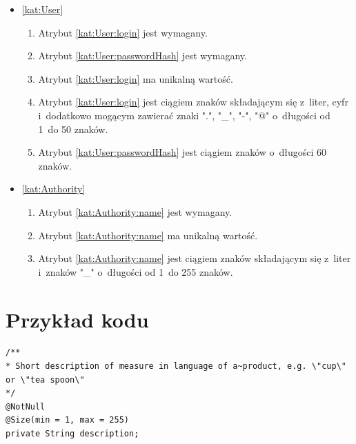 \begin{itemize}[label={\textbf{Ograniczenia dla}}, wide, labelwidth=!, labelindent=0pt]
    \setlength\itemsep{1.75em}
    \item\ref{kat:User}\mynobreakpar
    \begin{enumerate}[label={\textbf{OGR/\protect\threedigits{\arabic{enumi}}}}, wide, labelwidth=!, align=left, leftmargin=3cm]
        \item Atrybut \ref{kat:User:login} jest wymagany.
        \item Atrybut \ref{kat:User:passwordHash} jest wymagany.
        \item Atrybut \ref{kat:User:login} ma unikalną wartość.
        \item Atrybut \ref{kat:User:login} jest ciągiem znaków składającym się z~liter, cyfr i~dodatkowo mogącym zawierać znaki ".", "\_", "-", "@" o~długości od 1~do 50 znaków.
        \item Atrybut \ref{kat:User:passwordHash} jest ciągiem znaków o~długości 60 znaków.
    \end{enumerate}
    \item\ref{kat:Authority}\mynobreakpar
    \begin{enumerate}[label={\textbf{OGR/\protect\threedigits{\arabic{enumi}}}}, wide, labelwidth=!, align=left, leftmargin=3cm, resume]
        \item Atrybut \ref{kat:Authority:name} jest wymagany.
        \item Atrybut \ref{kat:Authority:name} ma unikalną wartość.
        \item Atrybut \ref{kat:Authority:name} jest ciągiem znaków składającym się z~liter i~znaków "\_" o~długości od 1~do 255 znaków.
    \end{enumerate}

\end{itemize}

\section{Przykład kodu}
\noindent\hspace{.075\textwidth}\begin{minipage}{.85\textwidth}
                                    \begin{verbatim}
/**
* Short description of measure in language of a~product, e.g. \"cup\" or \"tea spoon\"
*/
@NotNull
@Size(min = 1, max = 255)
private String description;
                                    \end{verbatim}
                                    \begin{lstlisting}[caption={Komentarz w~stylu JavaDoc \source{\ownwork}}, label={listing:javadoc}]
                                    \end{lstlisting}
\end{minipage}
\thispagestyle{normal}
